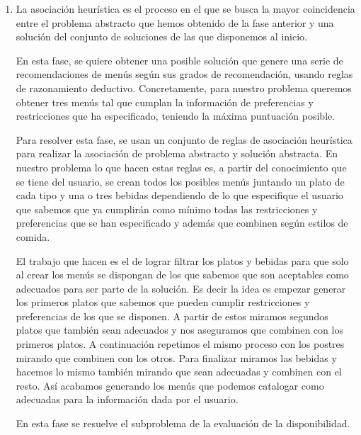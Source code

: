 \documentclass{article}
\begin{document}
\begin {enumerate}
    \item La asociación heurística es el proceso en el que se busca la mayor coincidencia entre el problema abstracto que hemos obtenido de la fase anterior y una solución del conjunto de soluciones de las que disponemos al inicio.
    \par
    En esta fase, se quiere obtener una posible solución que genere una serie de recomendaciones de menús según sus grados de recomendación, usando reglas de razonamiento deductivo. Concretamente, para nuestro problema queremos obtener tres menús tal que cumplan la información de preferencias y restricciones que ha especificado, teniendo la máxima puntuación posible.
    \par
    Para resolver esta fase, se usan un conjunto de reglas de asociación heurística para realizar la asociación de problema abstracto y solución abstracta. En nuestro problema lo que hacen estas reglas es, a partir del conocimiento que se tiene del usuario, se crean todos los posibles menús juntando un plato de cada tipo y una o tres bebidas dependiendo de lo que especifique el usuario que sabemos que ya cumplirán como mínimo todas las restricciones y preferencias que se han especificado y además que combinen según estilos de comida.
    \par
    El trabajo que hacen es el de lograr filtrar los platos y bebidas para que solo al crear los menús se dispongan de los que sabemos que son aceptables como adecuados para ser parte de la solución.
    Es decir la idea es empezar generar los primeros platos que sabemos que pueden cumplir restricciones y preferencias de los que se disponen. A partir de estos miramos segundos platos que también sean adecuados y nos aseguramos que combinen con los primeros platos. A continuación repetimos el mismo proceso con los postres mirando que combinen con los otros. Para finalizar miramos las bebidas y hacemos lo mismo también mirando que sean adecuadas y combinen con el resto. Así acabamos generando los menús que podemos catalogar como adecuadas para la información dada por el usuario.
    \par
    En esta fase se resuelve el subproblema de la evaluación de la disponibilidad.


\end{enumerate}
\end{document}
